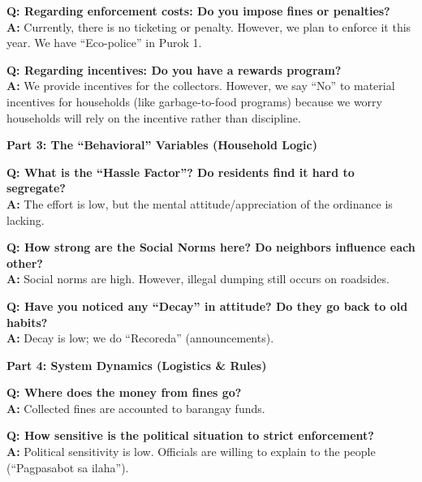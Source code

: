 \noindent \textbf{Q: Regarding enforcement costs: Do you impose fines or penalties?} \\
\textbf{A:} Currently, there is no ticketing or penalty.
However, we plan to enforce it this year. We have ``Eco-police'' in Purok 1.

\vspace{0.3cm}

\noindent \textbf{Q: Regarding incentives: Do you have a rewards program?} \\
\textbf{A:} We provide incentives for the collectors.
However, we say ``No'' to material incentives for households (like garbage-to-food programs) because we worry households will rely on the incentive rather than discipline.

\vspace{0.5cm}

\noindent \textbf{\large Part 3: The ``Behavioral'' Variables (Household Logic)}
\vspace{0.2cm}

\noindent \textbf{Q: What is the ``Hassle Factor''? Do residents find it hard to segregate?} \\
\textbf{A:} The effort is low, but the mental attitude/appreciation of the ordinance is lacking.
\vspace{0.3cm}

\noindent \textbf{Q: How strong are the Social Norms here? Do neighbors influence each other?} \\
\textbf{A:} Social norms are high.
However, illegal dumping still occurs on roadsides.

\vspace{0.3cm}

\noindent \textbf{Q: Have you noticed any ``Decay'' in attitude? Do they go back to old habits?} \\
\textbf{A:} Decay is low; we do ``Recoreda'' (announcements).
\vspace{0.5cm}

\noindent \textbf{\large Part 4: System Dynamics (Logistics \& Rules)}
\vspace{0.2cm}

\noindent \textbf{Q: Where does the money from fines go?} \\
\textbf{A:} Collected fines are accounted to barangay funds.

\vspace{0.3cm}

\noindent \textbf{Q: How sensitive is the political situation to strict enforcement?} \\
\textbf{A:} Political sensitivity is low.
Officials are willing to explain to the people (``Pagpasabot sa ilaha'').
